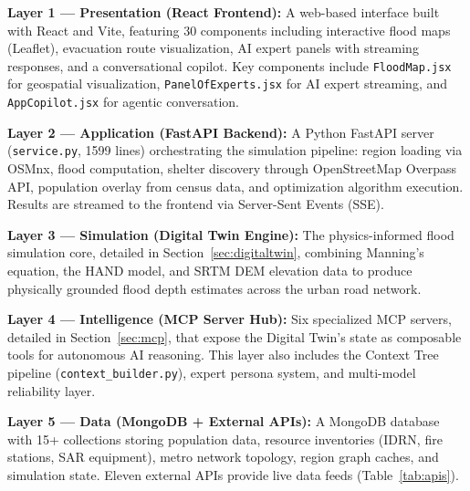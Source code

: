 \documentclass[journal]{IEEEtran}
\begin{document}
\textbf{Layer 1 --- Presentation (React Frontend):} A web-based interface
built with React and Vite, featuring 30 components including interactive
flood maps (Leaflet), evacuation route visualization, AI expert panels with
streaming responses, and a conversational copilot. Key components include
\texttt{FloodMap.jsx} for geospatial visualization, \texttt{PanelOfExperts.jsx}
for AI expert streaming, and \texttt{AppCopilot.jsx} for agentic conversation.

\textbf{Layer 2 --- Application (FastAPI Backend):} A Python FastAPI server
(\texttt{service.py}, 1599 lines) orchestrating the simulation pipeline:
region loading via OSMnx, flood computation, shelter discovery through
OpenStreetMap Overpass API, population overlay from census data, and
optimization algorithm execution. Results are streamed to the frontend via
Server-Sent Events (SSE).

\textbf{Layer 3 --- Simulation (Digital Twin Engine):} The physics-informed
flood simulation core, detailed in Section~\ref{sec:digitaltwin}, combining
Manning's equation, the HAND model, and SRTM DEM elevation data to produce
physically grounded flood depth estimates across the urban road network.

\textbf{Layer 4 --- Intelligence (MCP Server Hub):} Six specialized MCP
servers, detailed in Section~\ref{sec:mcp}, that expose the Digital Twin's
state as composable tools for autonomous AI reasoning. This layer also
includes the Context Tree pipeline (\texttt{context\_builder.py}), expert
persona system, and multi-model reliability layer.

\textbf{Layer 5 --- Data (MongoDB + External APIs):} A MongoDB database with
15+ collections storing population data, resource inventories (IDRN, fire
stations, SAR equipment), metro network topology, region graph caches, and
simulation state. Eleven external APIs provide live data feeds (Table~\ref{tab:apis}).
\end{document}

